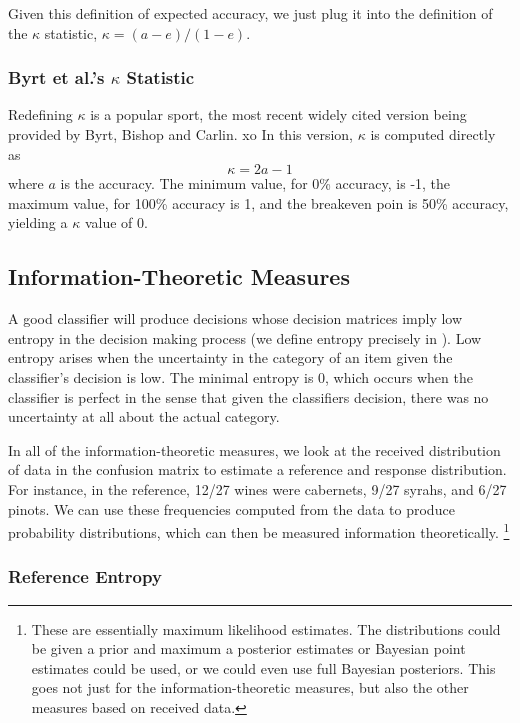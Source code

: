 Given this definition of expected accuracy, we just plug it into the
definition of the $\kappa$ statistic, $\kappa = (a - e)/(1 - e)$.


\subsubsection{Byrt et al.'s $\kappa$ Statistic}

Redefining $\kappa$ is a popular sport, the most recent widely cited
version being provided by Byrt, Bishop and Carlin.%
%
xo%
In this version, $\kappa$ is computed directly as
%
\begin{equation}
\kappa = 2 a - 1
\end{equation}
%
where $a$ is the accuracy.  The minimum value, for 0\% accuracy,
is -1, the maximum value, for 100\% accuracy is 1, and the
breakeven poin is 50\% accuracy, yielding a $\kappa$ value of 0.


\subsection{Information-Theoretic Measures}

A good classifier will produce decisions whose decision matrices imply
low entropy in the decision making process (we define entropy
precisely in ).  Low entropy arises when the
uncertainty in the category of an item given the classifier's decision
is low.  The minimal entropy is 0, which occurs when the classifier is
perfect in the sense that given the classifiers decision, there was no
uncertainty at all about the actual category.  

In all of the information-theoretic measures, we look at the received
distribution of data in the confusion matrix to estimate a reference
and response distribution.  For instance, in the reference, 12/27
wines were cabernets, 9/27 syrahs, and 6/27 pinots.  We can use these
frequencies computed from the data to produce probability
distributions, which can then be measured information theoretically.%
%
\footnote{These are essentially maximum likelihood estimates.  The
  distributions could be given a prior and maximum a posterior
  estimates or Bayesian point estimates could be used, or we could
  even use full Bayesian posteriors.  This goes not just for the
  information-theoretic measures, but also the other measures based on
  received data.}


\subsubsection{Reference Entropy}


